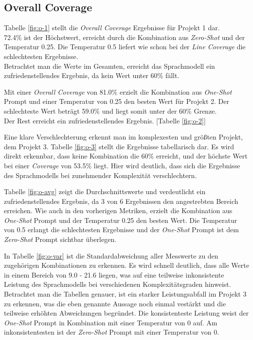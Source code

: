 \subsection{Overall Coverage}
Tabelle \ref{fig:o-1} stellt die \textit{Overall Coverage} Ergebnisse für Projekt 1 dar. \\72.4\% ist der Höchstwert, erreicht durch die Kombination aus \textit{Zero-Shot} und der Temperatur 0.25. Die Temperatur 0.5 liefert wie schon bei der \textit{Line Coverage}  die schlechtesten Ergebnisse.\\ Betrachtet man die Werte im Gesamten, erreicht das Sprachmodell ein zufriedenstellendes Ergebnis, da kein Wert unter 60\% fällt.

Mit einer \textit{Overall Coverage}  von 81.0\% erzielt die Kombination aus \textit{One-Shot} Prompt und einer Temperatur von 0.25 den besten Wert für Projekt 2. Der schlechteste Wert beträgt 59.0\% und liegt somit unter der 60\% Grenze.\\ Der Rest erreicht ein zufriedenstellendes Ergebnis. [Tabelle \ref{fig:o-2}]

Eine klare Verschlechterung erkennt man im komplexesten und größten Projekt, dem Projekt 3. Tabelle \ref{fig:o-3} stellt die Ergebnisse tabellarisch dar. Es wird direkt erkennbar, dass keine Kombination die 60\% erreicht, und der höchste Wert bei einer \textit{Coverage} von 53.5\% liegt. Hier wird deutlich, dass sich die Ergebnisse des Sprachmodells bei zunehmender Komplexität verschlechtern.

Tabelle \ref{fig:o-avg} zeigt die Durchschnittswerte und verdeutlicht ein zufriedenstellendes Ergebnis, da 3 von 6 Ergebnissen den angestrebten Bereich erreichen. Wie auch in den vorherigen Metriken, erzielt die Kombination aus \textit{One-Shot} Prompt und der Temperatur 0.25 den besten Wert. Die Temperatur von 0.5 erlangt die schlechtesten Ergebnisse und der \textit{One-Shot} Prompt ist dem \textit{Zero-Shot} Prompt sichtbar überlegen.

In Tabelle \ref{fig:o-var} ist die Standardabweichung aller Messwerte zu den zugehörigen Kombinationen zu erkennen. Es wird schnell deutlich, dass alle Werte in einem Bereich von 9.0 - 21.6 liegen, was auf eine teilweise inkonsistente Leistung des Sprachmodells bei verschiedenen Komplexitätsgraden hinweist. Betrachtet man die Tabellen genauer, ist ein starker Leistungsabfall im Projekt 3 zu erkennen, was die eben genannte Aussage noch einmal vestärkt und die teilweise erhöhten Abweichungen begründet. Die konsistenteste Leistung weist der \textit{One-Shot} Prompt in Kombination mit einer Temperatur von 0 auf. Am inkonsistentesten ist der \textit{Zero-Shot} Prompt mit einer Temperatur von 0.


